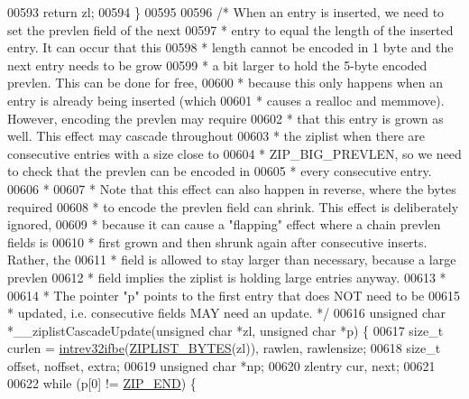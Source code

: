 \begin{DoxyCode}
{{00593     \textcolor{keywordflow}{return} zl;
00594 \}
00595 
00596 \textcolor{comment}{/* When an entry is inserted, we need to set the prevlen field of the next}
00597 \textcolor{comment}{ * entry to equal the length of the inserted entry. It can occur that this}
00598 \textcolor{comment}{ * length cannot be encoded in 1 byte and the next entry needs to be grow}
00599 \textcolor{comment}{ * a bit larger to hold the 5-byte encoded prevlen. This can be done for free,}
00600 \textcolor{comment}{ * because this only happens when an entry is already being inserted (which}
00601 \textcolor{comment}{ * causes a realloc and memmove). However, encoding the prevlen may require}
00602 \textcolor{comment}{ * that this entry is grown as well. This effect may cascade throughout}
00603 \textcolor{comment}{ * the ziplist when there are consecutive entries with a size close to}
00604 \textcolor{comment}{ * ZIP\_BIG\_PREVLEN, so we need to check that the prevlen can be encoded in}
00605 \textcolor{comment}{ * every consecutive entry.}
00606 \textcolor{comment}{ *}
00607 \textcolor{comment}{ * Note that this effect can also happen in reverse, where the bytes required}
00608 \textcolor{comment}{ * to encode the prevlen field can shrink. This effect is deliberately ignored,}
00609 \textcolor{comment}{ * because it can cause a "flapping" effect where a chain prevlen fields is}
00610 \textcolor{comment}{ * first grown and then shrunk again after consecutive inserts. Rather, the}
00611 \textcolor{comment}{ * field is allowed to stay larger than necessary, because a large prevlen}
00612 \textcolor{comment}{ * field implies the ziplist is holding large entries anyway.}
00613 \textcolor{comment}{ *}
00614 \textcolor{comment}{ * The pointer "p" points to the first entry that does NOT need to be}
00615 \textcolor{comment}{ * updated, i.e. consecutive fields MAY need an update. */}
00616 \textcolor{keywordtype}{unsigned} \textcolor{keywordtype}{char} *\_\_ziplistCascadeUpdate(\textcolor{keywordtype}{unsigned} \textcolor{keywordtype}{char} *zl, \textcolor{keywordtype}{unsigned} \textcolor{keywordtype}{char} *p) \{
00617     size\_t curlen = \hyperlink{endianconv_8h_a4e85d9ae58a3b1e6ceaabfd4689002c7}{intrev32ifbe}(\hyperlink{ziplist_8c_a28b9c7884758bc2d52f204903a4bb642}{ZIPLIST\_BYTES}(zl)), rawlen, rawlensize;
00618     size\_t offset, noffset, extra;
00619     \textcolor{keywordtype}{unsigned} \textcolor{keywordtype}{char} *np;
00620     zlentry cur, next;
00621 
00622     \textcolor{keywordflow}{while} (p[0] != \hyperlink{ziplist_8c_a31a8f9d5b5bad75318741cfca5de5ea8}{ZIP\_END}) \{
}}
\end{DoxyCode}
